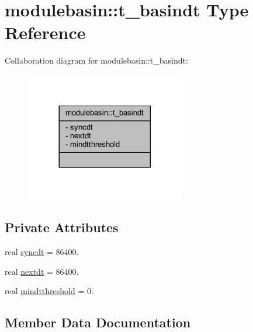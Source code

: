\hypertarget{structmodulebasin_1_1t__basindt}{}\section{modulebasin\+:\+:t\+\_\+basindt Type Reference}
\label{structmodulebasin_1_1t__basindt}


Collaboration diagram for modulebasin\+:\+:t\+\_\+basindt\+:\nopagebreak
\begin{figure}[H]
\begin{center}
\leavevmode
\includegraphics[width=197pt]{structmodulebasin_1_1t__basindt__coll__graph}
\end{center}
\end{figure}
\subsection*{Private Attributes}
\begin{DoxyCompactItemize}
\item 
real \mbox{\hyperlink{structmodulebasin_1_1t__basindt_ae99b9d619973de826ea4b0cd3117c4f4}{syncdt}} = 86400.
\item 
real \mbox{\hyperlink{structmodulebasin_1_1t__basindt_aa53f42df5d30e2cc1423cb1d78319603}{nextdt}} = 86400.
\item 
real \mbox{\hyperlink{structmodulebasin_1_1t__basindt_a046c05fcc869b87215cf1bf51500bef2}{mindtthreshold}} = 0.
\end{DoxyCompactItemize}


\subsection{Member Data Documentation}
\mbox{\label{structmodulebasin_1_1t__basindt_a046c05fcc869b87215cf1bf51500bef2}} 
